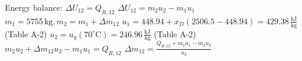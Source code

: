 Energy balance: \( \Delta U_{12} = Q_{R,12} \)  
\( \Delta U_{12} = m_2 u_2 - m_1 u_1 \)  
\( m_1 = 5755 \, \text{kg}, m_2 = m_1 + \Delta m_{12} \)  
\( u_1 = 448.94 + x_D (2506.5 - 448.94) = 429.38 \, \frac{\text{kJ}}{\text{kg}} \) (Table A-2)  
\( u_2 = u_g (70^\circ \text{C}) = 246.96 \, \frac{\text{kJ}}{\text{kg}} \) (Table A-2)  
\( m_2 u_2 + \Delta m_{12} u_2 - m_1 u_1 = Q_{R,12} \)  
\( \Delta m_{12} = \frac{Q_{R,12} + m_1 u_1 - m_2 u_2}{u_2} \)